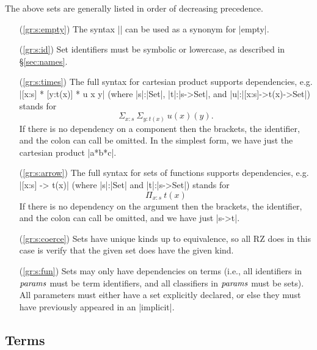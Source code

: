 \documentclass[11pt]{article}
\newcommand{\metav}[1]{\mbox{\textit{#1}}}
\newcommand{\Params}{\metav{params}}
\begin{document}
The above sets are generally listed in order of decreasing precedence.  
\begin{itemize}
\item[(\ref{gr:s:empty})] The syntax |{}| can be used as a synonym for |empty|.
\item[(\ref{gr:s:id})] Set identifiers must be symbolic or lowercase, as described in \S\ref{sec:names}.
\item[(\ref{gr:s:times})] The full syntax for cartesian product supports dependencies, e.g. |[x:s] * [y:t(x)] * u x y| (where |s|:|Set|, |t|:|s->Set|, and |u|:|[x:s]->t(x)->Set|) stands
for 
\[
\Sigma_{x:s}\ \Sigma_{y:t(x)}\ u(x)(y).
\]
If there is no dependency on a component then the brackets, the identifier, and the colon can call be omitted.  In the simplest form, we have just the cartesian product |a*b*c|.
\item[(\ref{gr:s:arrow})] The full syntax for sets of functions supports dependencies, e.g. |[x:s] -> t(x)| (where |s|:|Set| and |t|:|s->Set|) stands
for 
\[
\Pi_{x:s}\ t(x)
\]
If there is no dependency on the argument then the brackets, the identifier, and the colon can call be omitted, and we have just |s->t|.
\item[(\ref{gr:s:coerce})] Sets have unique kinds up to equivalence, so all RZ does in this case is verify that the given set does have the given kind.
\item[(\ref{gr:s:fun})] Sets may only have dependencies on terms (i.e., all identifiers in $\Params$ must be term identifiers, and all classifiers in $\Params$ must be sets).  All parameters must either have a set explicitly declared, or else they must have previously appeared in an |implicit|.
\end{itemize}

\subsection{Terms}
\end{document}
